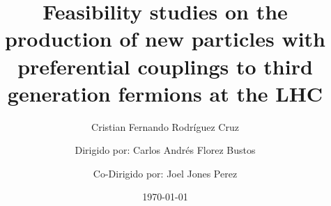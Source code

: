 \documentclass[%
 onecolumn,
 amsmath,amssymb,
 aps,nofootinbib,
]{revtex4-2}
\begin{document}
\title{Feasibility studies on the production of new particles with preferential couplings to third generation fermions at the LHC}

\author{Cristian Fernando Rodríguez Cruz}

\author{Dirigido por: Carlos Andrés Florez Bustos}

\author{Co-Dirigido por: Joel Jones Perez}

\date{\today}
\begin{abstract}
    
\end{abstract}
\maketitle


\end{document}
